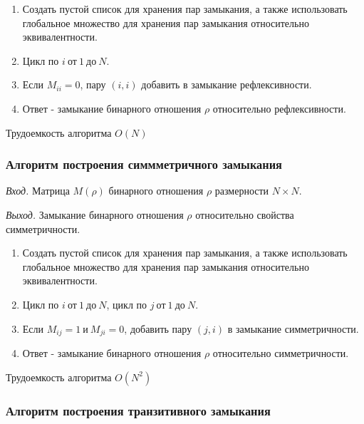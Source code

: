 \documentclass[bachelor, och, labwork]{shiza}
\begin{document}
\begin{enumerate}
    \item Создать пустой список для хранения пар замыкания, а также использовать
    глобальное множество для хранения пар замыкания относительно эквивалентности.
    \item Цикл по $i ~\text{от}~ 1 ~\text{до}~ N$.
    \item Если $M_{ii} = 0$, пару $(i, i)$ добавить в замыкание 
    рефлексивности.
    \item Ответ - замыкание бинарного отношения $\rho$ относительно рефлексивности.
\end{enumerate}
Трудоемкость алгоритма $O(N)$


\subsubsection{Алгоритм построения симмметричного замыкания}


\textit{Вход.} Матрица $M(\rho)$ бинарного отношения $\rho$ размерности
$N \times N$.

\textit{Выход.} Замыкание бинарного отношения $\rho$ относительно свойства симметричности.

\begin{enumerate}
    \item Создать пустой список для хранения пар замыкания, а также использовать
    глобальное множество для хранения пар замыкания относительно эквивалентности.
    \item Цикл по $i ~\text{от}~ 1 ~\text{до}~ N$, цикл по $j ~\text{от}~ 1 ~\text{до}~ N$.
    \item Если $M_{ij} = 1 ~\text{и}~ M_{ji} = 0$, добавить пару $(j, i)$
    в замыкание симметричности.
    \item Ответ - замыкание бинарного отношения $\rho$ относительно симметричности.
\end{enumerate}
Трудоемкость алгоритма $O(N^2)$


\subsubsection{Алгоритм построения транзитивного замыкания}
\end{document}
